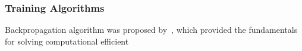 \subsubsection{Training Algorithms}
Backpropagation algorithm was proposed by~\citet{werbos1975beyond}, which provided the fundamentals for solving  computational efficient 